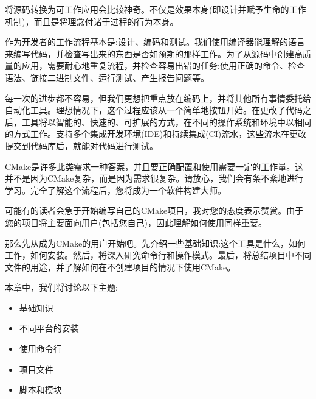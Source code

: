 将源码转换为可工作应用会比较神奇。不仅是效果本身(即设计并赋予生命的工作机制)，而且是将理念付诸于过程的行为本身。

作为开发者的工作流程基本是:设计、编码和测试。我们使用编译器能理解的语言来编写代码，并检查写出来的东西是否如预期的那样工作。为了从源码中创建高质量的应用，需要耐心地重复流程，并检查容易出错的任务:使用正确的命令、检查语法、链接二进制文件、运行测试、产生报告问题等。

每一次的进步都不容易，但我们更想把重点放在编码上，并将其他所有事情委托给自动化工具。理想情况下，这个过程应该从一个简单地按钮开始。在更改了代码之后，工具将以智能的、快速的、可扩展的方式，在不同的操作系统和环境中以相同的方式工作。支持多个集成开发环境(IDE)和持续集成(CI)流水，这些流水在更改提交到代码库后，就能对代码进行测试。

CMake是许多此类需求一种答案，并且要正确配置和使用需要一定的工作量。这并不是因为CMake复杂，而是因为需求很复杂。请放心，我们会有条不紊地进行学习。完全了解这个流程后，您将成为一个软件构建大师。

可能有的读者会急于开始编写自己的CMake项目，我对您的态度表示赞赏。由于您的项目将主要面向用户(包括您自己)，因此理解如何使用同样重要。

那么先从成为CMake的用户开始吧。先介绍一些基础知识:这个工具是什么，如何工作，如何安装。然后，将深入研究命令行和操作模式。最后，将总结项目中不同文件的用途，并了解如何在不创建项目的情况下使用CMake。

本章中，我们将讨论以下主题:

\begin{itemize}
\item 
基础知识

\item 
不同平台的安装

\item 
使用命令行

\item 
项目文件

\item 
脚本和模块
\end{itemize}

